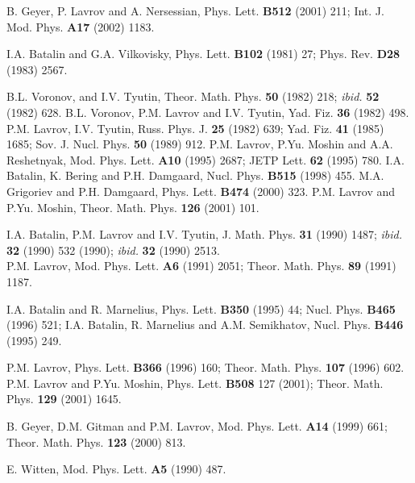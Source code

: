 \documentclass[a4paper,11pt]{article}
\begin{document}
\begin{thebibliography}{99}
  B. Geyer, P. Lavrov and A. Nersessian, Phys. Lett.
\textbf{B512} (2001) 211; Int. J. Mod. Phys. \textbf{A17} (2002) 1183.

  I.A. Batalin and G.A. Vilkovisky, Phys. Lett. \textbf{%
B102} (1981) 27; Phys. Rev. \textbf{D28} (1983) 2567.

  B.L. Voronov, and I.V. Tyutin, Theor. Math. Phys. %
\textbf{50} (1982) 218; \textit{ibid.} \textbf{52} (1982) 628. B.L.
Voronov, P.M. Lavrov and I.V. Tyutin, Yad. Fiz. \textbf{36} (1982) 498.
\newline
P.M. Lavrov, I.V. Tyutin, Russ. Phys. J. \textbf{25} (1982) 639;
Yad. Fiz. \textbf{41} (1985) 1685; Sov. J. Nucl. Phys.
\textbf{50} (1989) 912.\newline
P.M. Lavrov, P.Yu. Moshin and A.A. Reshetnyak, Mod. Phys. Lett.
\textbf{A10} (1995) 2687; JETP Lett. \textbf{62} (1995) 780.%
\newline
I.A. Batalin, K. Bering and P.H. Damgaard, Nucl. Phys. \textbf{B515} 
(1998) 455.\newline
M.A. Grigoriev and P.H. Damgaard, Phys. Lett. \textbf{B474} (2000) 323.
\newline
P.M. Lavrov and P.Yu. Moshin, Theor. Math. Phys. \textbf{126} (2001) 101.


  I.A. Batalin, P.M. Lavrov and I.V. Tyutin, J. Math. Phys.
\textbf{31} (1990) 1487; \textit{ibid.} \textbf{32} (1990) 532 (1990); 
\textit{ibid.} \textbf{32} (1990) 2513.\\
P.M. Lavrov, Mod. Phys. Lett. \textbf{A6} (1991) 2051; Theor. Math.
Phys. \textbf{89} (1991) 1187.

  I.A. Batalin and R. Marnelius, Phys. Lett. \textbf{%
B350} (1995) 44; Nucl. Phys. \textbf{B465} (1996) 521;\newline
I.A. Batalin, R. Marnelius and A.M. Semikhatov, Nucl. Phys. \textbf{%
B446} (1995) 249.

  P.M. Lavrov, Phys. Lett. \textbf{B366} (1996) 160;
Theor. Math. Phys. \textbf{107} (1996) 602.\newline
P.M. Lavrov and P.Yu. Moshin, Phys. Lett. \textbf{B508} 127 (2001); 
Theor. Math. Phys. \textbf{129} (2001) 1645.

  B. Geyer, D.M. Gitman and P.M. Lavrov, Mod. Phys.
Lett. \textbf{A14} (1999) 661; Theor. Math. Phys. \textbf{123}
(2000) 813.

  E. Witten, Mod. Phys. Lett. \textbf{A5} (1990) 487.


\end{thebibliography}
\end{document}
